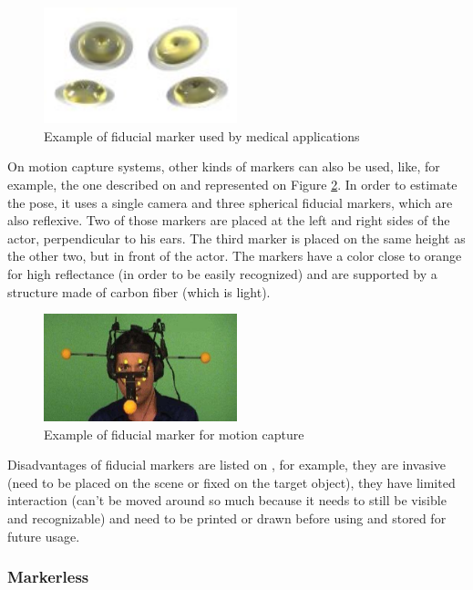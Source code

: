 \documentclass[msc, a4paper, classic, en]{ufbathesis}
\begin{document}
\begin{figure}
\label{fig:sticker}
\centering
\includegraphics[width=0.5\textwidth]{images/sticker.png}
\caption{Example of fiducial marker used by medical applications}
\end{figure}

On motion capture systems, other kinds of markers can also be used, like, for example, the one described on \cite{4526681} and represented on Figure \ref{fig:helmet}. In order to estimate the pose, it uses a single camera and three spherical fiducial markers, which are also reflexive. Two of those markers are placed at the left and right sides of the actor, perpendicular to his ears. The third marker is placed on the same height as the other two, but in front of the actor. The markers have a color close to orange for high reflectance (in order to be easily recognized) and are supported by a structure made of carbon fiber (which is light).

\begin{figure}
\label{fig:helmet}
\centering
\includegraphics[width=0.5\textwidth]{images/helmet.png}
\caption{Example of fiducial marker for motion capture}
\end{figure}

Disadvantages of fiducial markers are listed on \cite{dolz}, for example, they are invasive (need to be placed on the scene or fixed on the target object), they have limited interaction (can't be moved around so much because it needs to still be visible and recognizable) and need to be printed or drawn before using and stored for future usage.

\subsubsection{Markerless}
\end{document}
